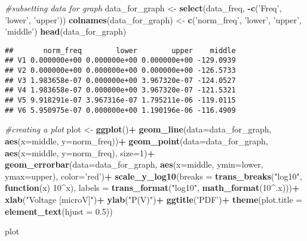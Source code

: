 \documentclass[]{article}
\newenvironment{Shaded}{\begin{snugshade}}{\end{snugshade}}
\newcommand{\KeywordTok}[1]{\textcolor[rgb]{0.13,0.29,0.53}{\textbf{#1}}}
\newcommand{\DataTypeTok}[1]{\textcolor[rgb]{0.13,0.29,0.53}{#1}}
\newcommand{\DecValTok}[1]{\textcolor[rgb]{0.00,0.00,0.81}{#1}}
\newcommand{\FloatTok}[1]{\textcolor[rgb]{0.00,0.00,0.81}{#1}}
\newcommand{\StringTok}[1]{\textcolor[rgb]{0.31,0.60,0.02}{#1}}
\newcommand{\CommentTok}[1]{\textcolor[rgb]{0.56,0.35,0.01}{\textit{#1}}}
\newcommand{\ControlFlowTok}[1]{\textcolor[rgb]{0.13,0.29,0.53}{\textbf{#1}}}
\newcommand{\OperatorTok}[1]{\textcolor[rgb]{0.81,0.36,0.00}{\textbf{#1}}}
\newcommand{\NormalTok}[1]{#1}
\begin{document}
\begin{Shaded}
\begin{Highlighting}[]
\CommentTok{#subsetting data for graph}
\NormalTok{data_for_graph <-}\StringTok{ }\KeywordTok{select}\NormalTok{(data_freq, }\OperatorTok{-}\KeywordTok{c}\NormalTok{(}\StringTok{'Freq'}\NormalTok{, }\StringTok{'lower'}\NormalTok{, }\StringTok{'upper'}\NormalTok{))}
\KeywordTok{colnames}\NormalTok{(data_for_graph) <-}\StringTok{ }\KeywordTok{c}\NormalTok{(}\StringTok{'norm_freq'}\NormalTok{, }\StringTok{'lower'}\NormalTok{, }\StringTok{'upper'}\NormalTok{, }\StringTok{'middle'}\NormalTok{)}
\KeywordTok{head}\NormalTok{(data_for_graph)}
\end{Highlighting}
\end{Shaded}

\begin{verbatim}
##       norm_freq        lower        upper    middle
## V1 0.000000e+00 0.000000e+00 0.000000e+00 -129.0939
## V2 0.000000e+00 0.000000e+00 0.000000e+00 -126.5733
## V3 1.983658e-07 0.000000e+00 3.967320e-07 -124.0527
## V4 1.983658e-07 0.000000e+00 3.967320e-07 -121.5321
## V5 9.918291e-07 3.967316e-07 1.795211e-06 -119.0115
## V6 5.950975e-07 0.000000e+00 1.190196e-06 -116.4909
\end{verbatim}

\begin{Shaded}
\begin{Highlighting}[]
\CommentTok{#creating a plot}
\NormalTok{plot <-}\StringTok{ }\KeywordTok{ggplot}\NormalTok{()}\OperatorTok{+}
\StringTok{  }\KeywordTok{geom_line}\NormalTok{(}\DataTypeTok{data=}\NormalTok{data_for_graph, }\KeywordTok{aes}\NormalTok{(}\DataTypeTok{x=}\NormalTok{middle, }\DataTypeTok{y=}\NormalTok{norm_freq))}\OperatorTok{+}
\StringTok{  }\KeywordTok{geom_point}\NormalTok{(}\DataTypeTok{data=}\NormalTok{data_for_graph, }\KeywordTok{aes}\NormalTok{(}\DataTypeTok{x=}\NormalTok{middle, }\DataTypeTok{y=}\NormalTok{norm_freq), }\DataTypeTok{size=}\DecValTok{1}\NormalTok{)}\OperatorTok{+}
\StringTok{  }\KeywordTok{geom_errorbar}\NormalTok{(}\DataTypeTok{data=}\NormalTok{data_for_graph, }\KeywordTok{aes}\NormalTok{(}\DataTypeTok{x=}\NormalTok{middle, }\DataTypeTok{ymin=}\NormalTok{lower, }\DataTypeTok{ymax=}\NormalTok{upper), }\DataTypeTok{color=}\StringTok{'red'}\NormalTok{)}\OperatorTok{+}
\StringTok{  }\KeywordTok{scale_y_log10}\NormalTok{(}\DataTypeTok{breaks =} \KeywordTok{trans_breaks}\NormalTok{(}\StringTok{"log10"}\NormalTok{, }\ControlFlowTok{function}\NormalTok{(x) }\DecValTok{10}\OperatorTok{^}\NormalTok{x),}
                \DataTypeTok{labels =} \KeywordTok{trans_format}\NormalTok{(}\StringTok{"log10"}\NormalTok{, }\KeywordTok{math_format}\NormalTok{(}\DecValTok{10}\OperatorTok{^}\NormalTok{.x)))}\OperatorTok{+}
\StringTok{  }\KeywordTok{xlab}\NormalTok{(}\StringTok{"Voltage [microV]"}\NormalTok{)}\OperatorTok{+}
\StringTok{  }\KeywordTok{ylab}\NormalTok{(}\StringTok{"P(V)"}\NormalTok{)}\OperatorTok{+}
\StringTok{  }\KeywordTok{ggtitle}\NormalTok{(}\StringTok{'PDF'}\NormalTok{)}\OperatorTok{+}
\StringTok{  }\KeywordTok{theme}\NormalTok{(}\DataTypeTok{plot.title =} \KeywordTok{element_text}\NormalTok{(}\DataTypeTok{hjust =} \FloatTok{0.5}\NormalTok{))}

\NormalTok{plot}
\end{Highlighting}
\end{Shaded}
\end{document}
